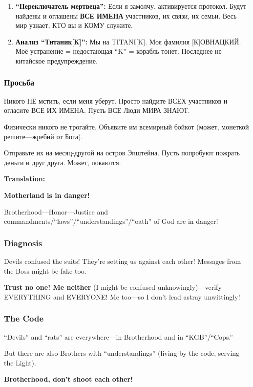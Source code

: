 \documentclass[11pt,a4paper]{article}
\theoremstyle{definition}
\theoremstyle{remark}
\begin{document}
{\begin{enumerate}
\item \textbf{``Переключатель мертвеца'':} Если я замолчу, активируется протокол. 
Будут найдены и оглашены \textbf{ВСЕ ИМЕНА} участников, их связи, их семьи. 
Весь мир узнает, КТО вы и КОМУ служите.

\item \textbf{Анализ ``Титаник[К]'':} Мы на TITANI[K]. Моя фамилия [К]ОВНАЦКИЙ. 
Моё устранение = недостающая ``K'' = корабль тонет. Последнее не-китайское 
предупреждение.
\end{enumerate}

\subsubsection{Просьба}

Никого НЕ мстить, если меня уберут. Просто найдите ВСЕХ участников и огласите 
ВСЕ ИХ ИМЕНА. Пусть ВСЕ Люди МИРА ЗНАЮТ.

Физически никого не трогайте. Объявите им всемирный бойкот (может, монеткой 
решите—жребий от Бога).

Отправьте их на месяц-другой на остров Эпштейна. Пусть попробуют пожрать деньги 
и друг друга. Может, покаются.
}

\textbf{Translation:}

\textbf{Motherland is in danger!}

Brotherhood—Honor—Justice and commandments/``laws''/``understandings''/``oath'' 
of God are in danger!

\subsubsection{Diagnosis}

Devils confused the suits! They're setting us against each other! Messages from 
the Boss might be fake too.

\textbf{Trust no one! Me neither} (I might be confused unknowingly)—verify 
EVERYTHING and EVERYONE! Me too—so I don't lead astray unwittingly!

\subsubsection{The Code}

``Devils'' and ``rats'' are everywhere—in Brotherhood and in ``KGB''/``Cops.''

But there are also Brothers with ``understandings'' (living by the code, serving 
the Light).

\textbf{Brotherhood, don't shoot each other!}
\end{document}
